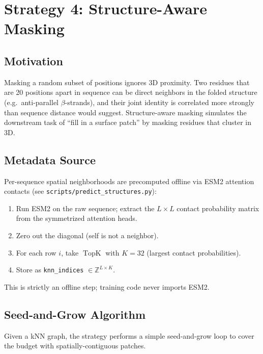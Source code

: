 \documentclass[11pt]{article}
\DeclareMathOperator{\TopK}{TopK}
\begin{document}
\section{Strategy 4: Structure-Aware Masking}

\subsection{Motivation}
Masking a random subset of positions ignores 3D proximity. Two residues
that are 20 positions apart in sequence can be direct neighbors in the
folded structure (e.g.\ anti-parallel $\beta$-strands), and their joint
identity is correlated more strongly than sequence distance would
suggest. Structure-aware masking simulates the downstream task of
``fill in a surface patch'' by masking residues that cluster in 3D.

\subsection{Metadata Source}
Per-sequence spatial neighborhoods are precomputed offline via ESM2
attention contacts (see \texttt{scripts/predict\_structures.py}):
\begin{enumerate}
\item Run ESM2 on the raw sequence; extract the $L \times L$ contact
probability matrix from the symmetrized attention heads.
\item Zero out the diagonal (self is not a neighbor).
\item For each row $i$, take $\TopK$ with $K = 32$ (largest contact
probabilities).
\item Store as \texttt{knn\_indices} $\in \mathbb{Z}^{L \times K}$.
\end{enumerate}
This is strictly an offline step; training code never imports ESM2.

\subsection{Seed-and-Grow Algorithm}
Given a kNN graph, the strategy performs a simple seed-and-grow loop
to cover the budget with spatially-contiguous patches.
\end{document}
